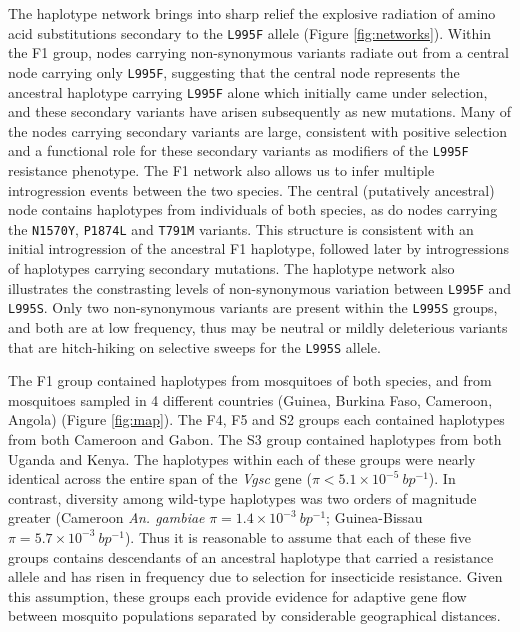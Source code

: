 \documentclass[a4paper,11pt,abstracton,hidelinks]{scrartcl}
\begin{document}
%
The haplotype network brings into sharp relief the explosive radiation of amino acid substitutions secondary to the \texttt{L995F} allele (Figure \ref{fig:networks}).
%
Within the F1 group, nodes carrying non-synonymous variants radiate out from a central node carrying only \texttt{L995F}, suggesting that the central node represents the ancestral haplotype carrying \texttt{L995F} alone which initially came under selection, and these secondary variants have arisen subsequently as new mutations.
%
Many of the nodes carrying secondary variants are large, consistent with positive selection and a functional role for these secondary variants as modifiers of the \texttt{L995F} resistance phenotype.
%
The F1 network also allows us to infer multiple introgression events between the two species.
%
The central (putatively ancestral) node contains haplotypes from individuals of both species, as do nodes carrying the \texttt{N1570Y}, \texttt{P1874L} and \texttt{T791M} variants.
%
This structure is consistent with an initial introgression of the ancestral F1 haplotype, followed later by introgressions of haplotypes carrying secondary mutations.
%
The haplotype network also illustrates the constrasting levels of non-synonymous variation between \texttt{L995F} and \texttt{L995S}.
%
Only two non-synonymous variants are present within the \texttt{L995S} groups, and both are at low frequency, thus may be neutral or mildly deleterious variants that are hitch-hiking on selective sweeps for the \texttt{L995S} allele.

%
The F1 group contained haplotypes from mosquitoes of both species, and from mosquitoes sampled in 4 different countries (Guinea, Burkina Faso, Cameroon, Angola) (Figure \ref{fig:map}).
%
The F4, F5 and S2 groups each contained haplotypes from both Cameroon and Gabon.
%
The S3 group contained haplotypes from both Uganda and Kenya.
%
The haplotypes within each of these groups were nearly identical across the entire span of the \textit{Vgsc} gene ($\pi < 5.1 \times 10^{-5}\ bp^{-1}$).
%
In contrast, diversity among wild-type haplotypes was two orders of magnitude greater (Cameroon \textit{An. gambiae} $\pi = 1.4 \times 10^{-3}\ bp^{-1}$; Guinea-Bissau $\pi = 5.7 \times 10^{-3}\ bp^{-1}$).
%
Thus it is reasonable to assume that each of these five groups contains descendants of an ancestral haplotype that carried a resistance allele and has risen in frequency due to selection for insecticide resistance.
%
Given this assumption, these groups each provide evidence for adaptive gene flow between mosquito populations separated by considerable geographical distances.
%
\end{document}
